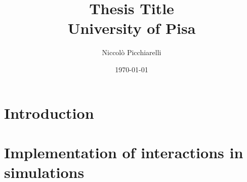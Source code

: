 \documentclass[a4paper]{book} %
\title{
	{Thesis Title}\\
	{\large University of Pisa}\\
}
\author{Niccolò Picchiarelli}
\date{\today}
\begin{document}
	
	\maketitle
	
	\chapter{Introduction}

	

	\chapter[Interaction Implementation]{Implementation of interactions in simulations}
	
	
	\begin{comment}
			\chapter{Implementation of interactions in simulations}
		\section{Previous Developments}
		\section{Steric Interactions}
		\subsection{All to All}
		\subsection{Range}s
		\section{Aligning Interactions}
		
		\chapter{Analysis of Structure and Dynamics}
		\section{Radial Distribution Function}
		
		\chapter{Inference of interaction potentials from data}
		\chapter{Conclusion}
	\end{comment}

	\printbibliography
\end{document}
